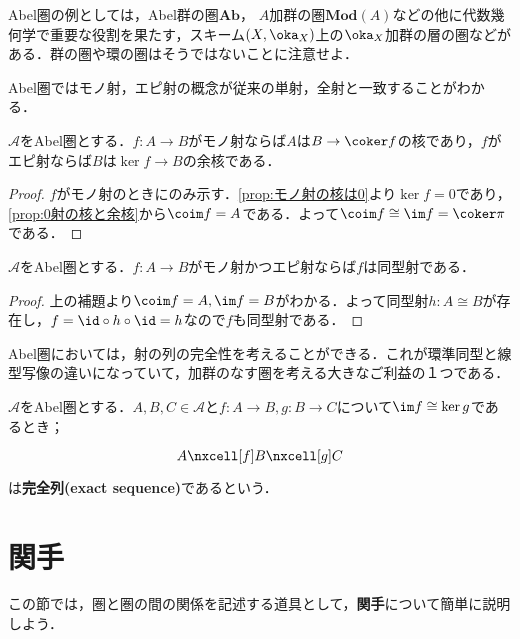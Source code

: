 Abel圏の例としては，Abel群の圏$\mathbf{Ab}$， $A$加群の圏$\mathbf{Mod}(A)$などの他に代数幾何学で重要な役割を果たす，スキーム$(X,\oka_X)$上の$\oka_X$加群の層の圏などがある．群の圏や環の圏はそうではないことに注意せよ．

Abel圏ではモノ射，エピ射の概念が従来の単射，全射と一致することがわかる．

\begin{lem}
	$\mathscr{A}$をAbel圏とする．$f:A\to B$がモノ射ならば$A$は$B\to\coker f$の核であり，$f$がエピ射ならば$B$は$\ker f\to B$の余核である．
\end{lem}

\begin{proof}
	$f$がモノ射のときにのみ示す．\ref{prop:モノ射の核は0}より$\ker f=0$であり，\ref{prop:0射の核と余核}から$\coim f=A$である．よって$\coim f\cong\im f=\coker\pi$である．
\end{proof}

\begin{prop}
	$\mathscr{A}$をAbel圏とする．$f:A\to B$がモノ射かつエピ射ならば$f$は同型射である．
\end{prop}

\begin{proof}
	上の補題より$\coim f=A,\im f=B$がわかる．よって同型射$h:A\cong B$が存在し，$f=\id\circ h\circ \id=h$なので$f$も同型射である．
\end{proof}

Abel圏においては，射の列の完全性を考えることができる．これが環準同型と線型写像の違いになっていて，加群のなす圏を考える大きなご利益の１つである．

\begin{defi}[完全列]
	$\mathscr{A}$をAbel圏とする．$A,B,C\in\mathscr{A}$と$f:A\to B, g:B\to C$について$\im f\cong\ker g$であるとき；
	\[\begin{tikzcd}
		A\nxcell[f]B\nxcell[g]C
	\end{tikzcd}\]
	は\textbf{完全列(exact sequence)}であるという．
\end{defi}

\section{関手}

この節では，圏と圏の間の関係を記述する道具として，\textbf{関手}について簡単に説明しよう．

